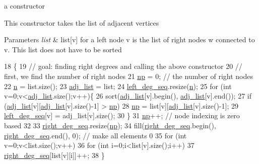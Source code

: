 a constructor 

This constructor takes the list of adjacent vertices 
\begin{DoxyParams}{Parameters}
{\em list} & list\mbox{[}v\mbox{]} for a left node v is the list of right nodes w connected to v. This list does not have to be sorted \\
\hline
\end{DoxyParams}

\begin{DoxyCode}
18 \{
19   \textcolor{comment}{// goal: finding right degrees and calling the above constructor}
20   \textcolor{comment}{// first, we find the number of right nodes}
21   \hyperlink{classb__graph_acffdd5f20329515eb6ec17ad24f1ca64}{np} = 0; \textcolor{comment}{// the number of right nodes}
22   \hyperlink{classb__graph_a9e211d40c1799bc9b125de472ff06642}{n} = list.size();
23   \hyperlink{classb__graph_a2a89d2e8f958270952aab2e8769b7342}{adj\_list} = list;
24   \hyperlink{classb__graph_a311d16462dbb10c47b3a6c80a42139d9}{left\_deg\_seq}.resize(\hyperlink{classb__graph_a9e211d40c1799bc9b125de472ff06642}{n});
25   \textcolor{keywordflow}{for} (\textcolor{keywordtype}{int} v=0;v<\hyperlink{classb__graph_a2a89d2e8f958270952aab2e8769b7342}{adj\_list}.size();v++)\{
26     sort(\hyperlink{classb__graph_a2a89d2e8f958270952aab2e8769b7342}{adj\_list}[v].begin(), \hyperlink{classb__graph_a2a89d2e8f958270952aab2e8769b7342}{adj\_list}[v].end());
27     \textcolor{keywordflow}{if} (\hyperlink{classb__graph_a2a89d2e8f958270952aab2e8769b7342}{adj\_list}[v][\hyperlink{classb__graph_a2a89d2e8f958270952aab2e8769b7342}{adj\_list}[v].size()-1] > \hyperlink{classb__graph_acffdd5f20329515eb6ec17ad24f1ca64}{np})
28       \hyperlink{classb__graph_acffdd5f20329515eb6ec17ad24f1ca64}{np} = list[v][\hyperlink{classb__graph_a2a89d2e8f958270952aab2e8769b7342}{adj\_list}[v].size()-1];
29     \hyperlink{classb__graph_a311d16462dbb10c47b3a6c80a42139d9}{left\_deg\_seq}[v] = adj\_list[v].size();
30   \}
31   \hyperlink{classb__graph_acffdd5f20329515eb6ec17ad24f1ca64}{np}++; \textcolor{comment}{// node indexing is zero based}
32 
33   \hyperlink{classb__graph_ae4c875ed6a583a78f38dfe958f20fad5}{right\_deg\_seq}.resize(\hyperlink{classb__graph_acffdd5f20329515eb6ec17ad24f1ca64}{np});
34   fill(\hyperlink{classb__graph_ae4c875ed6a583a78f38dfe958f20fad5}{right\_deg\_seq}.begin(), \hyperlink{classb__graph_ae4c875ed6a583a78f38dfe958f20fad5}{right\_deg\_seq}.end(), 0); \textcolor{comment}{// make all elements 0}
35   \textcolor{keywordflow}{for} (\textcolor{keywordtype}{int} v=0;v<list.size();v++)
36     \textcolor{keywordflow}{for} (\textcolor{keywordtype}{int} i=0;i<list[v].size();i++)
37       \hyperlink{classb__graph_ae4c875ed6a583a78f38dfe958f20fad5}{right\_deg\_seq}[list[v][i]]++;
38 \}
\end{DoxyCode}


